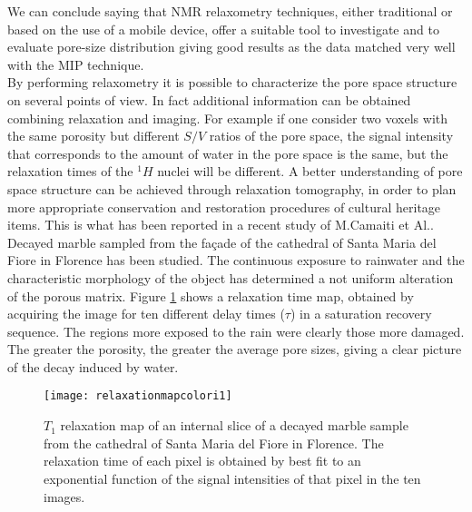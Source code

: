 \documentclass[a4paper,11pt]{report}
\begin{document}
 We can conclude saying that NMR relaxometry techniques, either traditional or based on the use of a mobile device, offer a suitable tool to investigate and to evaluate pore-size distribution giving good results as the data matched very well with the MIP technique\cite{due}.\\
By performing relaxometry it is possible to characterize the pore space structure on several points of view. In fact additional information can be obtained combining relaxation and imaging. For example if one consider two voxels with the same porosity but different $S/V$ ratios of the pore space, the signal intensity that corresponds to the amount of water in the pore space is the same, but the relaxation times of the $^1H$ nuclei will be different. A better understanding of pore space structure can be achieved through relaxation tomography, in order to plan more appropriate conservation and restoration procedures of cultural heritage items. This is what has been reported in a recent study of M.Camaiti et Al.\cite{quattro}. Decayed marble sampled from the façade of the cathedral of Santa Maria del Fiore in Florence has been studied. The continuous exposure to rainwater and the characteristic morphology of the object has determined a not uniform alteration of the porous matrix. Figure \ref{relaxationmap} shows a relaxation time map, obtained by acquiring the image for ten different delay times ($\tau$) in a saturation recovery sequence. The regions more exposed to the rain were clearly those more damaged. The greater the porosity, the greater the average pore sizes, giving a clear picture of the decay induced by water.
\begin{figure}[h]

\centering
\texttt{[image: relaxationmapcolori1]}
\caption{$T_1$ relaxation map of an internal slice of a decayed marble sample from the cathedral of Santa Maria del Fiore in Florence. The relaxation time of each pixel is obtained by best fit to an exponential function of the signal intensities of that pixel in the ten images.}\label{relaxationmap}
\end{figure}
\end{document}
